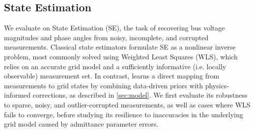 \subsection{State Estimation}
\label{subsec:SE}

We evaluate \genco on State Estimation (SE), the task of recovering bus voltage magnitudes and phase angles from noisy, incomplete, and corrupted measurements. Classical state estimators formulate SE as a nonlinear inverse problem, most commonly solved using Weighted Least Squares (WLS), which relies on an accurate grid model and a sufficiently informative (i.e. locally observable) measurement set. In contrast, \genco learns a direct mapping from measurements to grid states by combining data-driven priors with physics-informed corrections, as described in \cref{sec:model}. %
We first evaluate its robustness to sparse, noisy, and outlier-corrupted measurements, as well as cases where WLS fails to converge, before studying its resilience to inaccuracies in the underlying grid model caused by admittance parameter errors.


